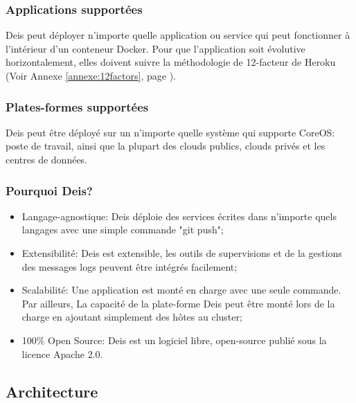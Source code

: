 \begin{onehalfspace}
\subsubsection*{Applications supportées}

Deis peut déployer n'importe quelle application ou service qui peut fonctionner à l'intérieur d'un conteneur Docker. Pour que l'application soit évolutive horizontalement, elles doivent suivre la méthodologie de 12-facteur de Heroku (Voir Annexe \ref{annexe:12factors}, page \pageref{annexe:12factors}).

\subsubsection*{Plates-formes supportées}
Deis peut être déployé sur un n'importe quelle système qui supporte CoreOS: poste de travail, ainsi que la plupart des clouds publics, clouds privés et les centres de données.


\subsubsection*{Pourquoi Deis?}

\begin{itemize}
	\item Langage-agnostique: Deis déploie des services écrites dans n'importe quels langages avec une simple commande "git push";
	\item Extensibilité: Deis est extensible, les outils de supervisions et de la gestions des messages logs peuvent être intégrés facilement;
	\item Scalabilité: Une application est monté en charge avec une seule commande. Par ailleurs, La capacité de la plate-forme Deis peut être monté lors de la charge en ajoutant simplement des hôtes au cluster;
	\item 100\% Open Source: Deis est un logiciel libre, open-source publié sous la licence Apache 2.0.
\end{itemize}


\subsection{Architecture}


\end{onehalfspace}
